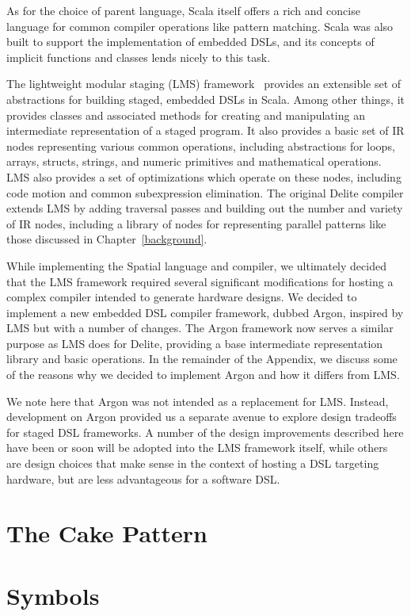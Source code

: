 As for the choice of parent language,
Scala itself offers a rich and concise language for common
compiler operations like pattern matching. Scala was also built to support
the implementation of embedded DSLs, and its concepts of implicit functions
and classes lends nicely to this task.

The lightweight modular staging (LMS) framework~\cite{lms} provides an
extensible set of abstractions for building staged, embedded DSLs in
Scala. Among other things, it provides classes and associated methods for creating
and manipulating an intermediate representation of a staged program.
It also provides a basic set of IR nodes representing various common operations,
including abstractions for loops, arrays, structs, strings, and numeric primitives
and mathematical operations.
LMS also provides a set of optimizations which operate on these nodes,
including code motion and common subexpression elimination.
The original Delite compiler extends LMS by adding traversal passes and
building out the number and variety of IR nodes, including a library of nodes
for representing parallel patterns like those discussed in Chapter~\ref{background}.

While implementing the Spatial language and compiler,
we ultimately decided that the LMS framework required several significant
modifications for hosting a complex compiler intended to generate hardware designs.
We decided to implement a new embedded DSL compiler framework, dubbed Argon,
inspired by LMS but with a number of changes.
The Argon framework now serves a similar purpose as LMS does for Delite,
providing a base intermediate representation library and basic operations.
In the remainder of the Appendix, we discuss some of the reasons
why we decided to implement Argon and how it differs from LMS.

We note here that Argon was not intended as a replacement for LMS.
Instead, development on Argon provided us a separate
avenue to explore design tradeoffs for staged DSL frameworks. A number of the
design improvements described here have been or soon will be adopted into the LMS framework itself,
while others are design choices that make sense in the context of hosting a
DSL targeting hardware, but are less advantageous for a software DSL.

\section{The Cake Pattern}

\section{Symbols}

